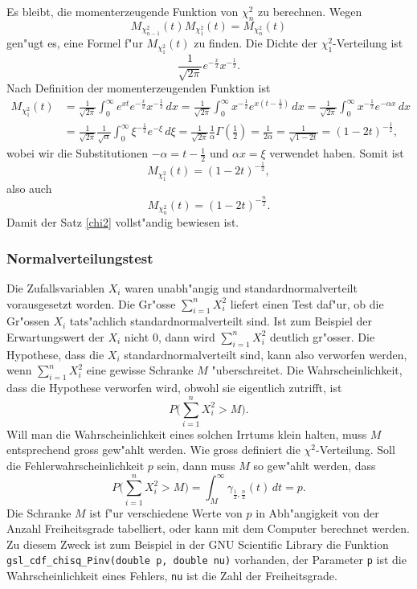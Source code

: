 {Es bleibt, die momenterzeugende Funktion von $\chi_n^2$ zu berechnen.
Wegen
\[
M_{\chi_{n-1}^2}(t)M_{\chi_1^2}(t)=M_{\chi_n^2}(t)
\]
gen"ugt es, eine Formel f"ur $M_{\chi_1^2}(t)$ zu finden.
Die Dichte
der $\chi_1^2$-Verteilung ist
\[
\frac1{\sqrt{2\pi}}e^{-\frac{x}2}x^{-\frac12}.
\]
Nach Definition der momenterzeugenden Funktion ist
\begin{align*}
M_{\chi_1^2}(t)
&=\frac1{\sqrt{2\pi}}\int_0^\infty e^{xt}e^{-\frac{x}2}x^{-\frac12}\,dx
=\frac1{\sqrt{2\pi}}\int_0^\infty x^{-\frac12}e^{x(t-\frac12)}\,dx
=\frac1{\sqrt{2\pi}}\int_0^\infty x^{-\frac12}e^{-\alpha x}\,dx\\
&=\frac1{\sqrt{2\pi}}\frac1{\sqrt{\alpha}}\int_0^\infty\xi^{-\frac12}e^{-\xi}\,d\xi
=\frac1{\sqrt{2\pi}}\frac1{\alpha}\Gamma(\frac12)=\frac1{2\alpha}
=\frac1{\sqrt{1-2t}}=(1-2t)^{-\frac12},
\end{align*}
wobei wir die Substitutionen $-\alpha=t-\frac12$ und $\alpha x=\xi$
verwendet haben.
Somit ist
\[
M_{\chi_1^2}(t)=(1-2t)^{-\frac12},
\]
also auch
\[
M_{\chi_n^2}(t)=(1-2t)^{-\frac{n}2}.
\]
Damit der Satz \ref{chi2} vollst"andig bewiesen ist.

\subsubsection{Normalverteilungstest}
Die Zufallsvariablen $X_i$ waren unabh"angig und standardnormalverteilt
vorausgesetzt worden.
Die Gr"osse $\sum_{i=1}^nX_i^2$ liefert einen Test daf"ur, ob die Gr"ossen
$X_i$ tats"achlich standardnormalverteilt sind.
Ist zum Beispiel der
Erwartungswert der $X_i$ nicht $0$, dann wird $\sum_{i=1}^nX_i^2$
deutlich gr"osser.
Die Hypothese, dass die $X_i$ standardnormalverteilt
sind, kann also verworfen werden, wenn $\sum_{i=1}^nX_i^2$ eine gewisse
Schranke $M$ "uberschreitet.
Die Wahrscheinlichkeit, dass die Hypothese
verworfen wird, obwohl sie eigentlich zutrifft, ist
\[
P\biggl(\sum_{i=1}^nX_i^2>M\biggr).
\]
Will man die Wahrscheinlichkeit eines solchen Irrtums klein halten, muss
$M$ entsprechend gross gew"ahlt werden.
Wie gross definiert die
$\chi^2$-Verteilung.
Soll die Fehlerwahrscheinlichkeit $p$ sein,
dann muss $M$ so gew"ahlt werden, dass 
\[
P\biggl(\sum_{i=1}^nX_i^2>M\biggr)=\int_M^\infty \gamma_{\frac12,\frac{n}2}(t)\,dt = p.
\]
Die Schranke $M$ ist f"ur verschiedene Werte von $p$ in Abh"angigkeit
von der Anzahl Freiheitsgrade tabelliert, oder kann mit dem Computer
berechnet werden.
Zu diesem Zweck ist zum Beispiel in der GNU Scientific
Library die Funktion \verb+gsl_cdf_chisq_Pinv(double p, double nu)+
vorhanden, der Parameter \verb+p+ ist die Wahrscheinlichkeit eines
Fehlers, {\tt nu} ist die Zahl der Freiheitsgrade.
}
